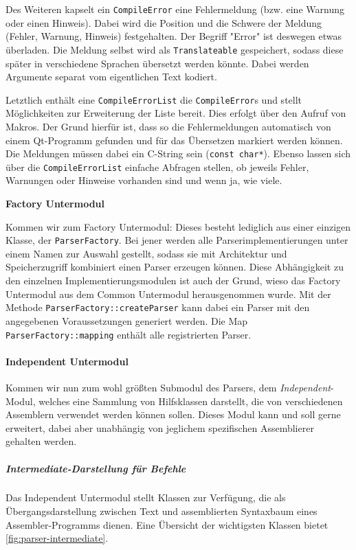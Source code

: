 Des Weiteren kapselt ein \texttt{CompileError} eine Fehlermeldung (bzw. eine
Warnung oder einen Hinweis). Dabei wird die Position und die Schwere der Meldung
(Fehler, Warnung, Hinweis) festgehalten. Der Begriff "Error" ist deswegen etwas
überladen. Die Meldung selbst wird als \texttt{Translateable} gespeichert,
sodass diese später in verschiedene Sprachen übersetzt werden könnte. Dabei
werden Argumente separat vom eigentlichen Text kodiert.

Letztlich enthält eine \texttt{CompileErrorList} die \texttt{CompileError}s und
stellt Möglichkeiten zur Erweiterung der Liste bereit. Dies erfolgt über den
Aufruf von Makros. Der Grund hierfür ist, dass so die Fehlermeldungen
automatisch von einem Qt-Programm gefunden und für das Übersetzen markiert
werden können. Die Meldungen müssen dabei ein C-String sein (\texttt{const
char*}). Ebenso lassen sich über die \texttt{CompileErrorList} einfache Abfragen
stellen, ob jeweils Fehler, Warnungen oder Hinweise vorhanden sind und wenn ja,
wie viele.

\textbf{Factory Untermodul}
\vspace{-0.2cm}

Kommen wir zum Factory Untermodul: Dieses besteht lediglich aus einer einzigen
Klasse, der \texttt{ParserFactory}. Bei jener werden alle
Parserimplementierungen unter einem Namen zur Auswahl gestellt, sodass sie mit
Architektur und Speicherzugriff kombiniert einen Parser erzeugen können. Diese
Abhängigkeit zu den einzelnen Implementierungsmodulen ist auch der Grund, wieso
das Factory Untermodul aus dem Common Untermodul herausgenommen wurde. Mit der
Methode \texttt{ParserFactory::createParser} kann dabei ein Parser mit den
angegebenen Voraussetzungen generiert werden. Die Map
\texttt{ParserFactory::mapping} enthält alle registrierten Parser.

\paragraph{Independent Untermodul}

Kommen wir nun zum wohl größten Submodul des Parsers, dem
\emph{Independent}-Modul, welches eine Sammlung von Hilfsklassen darstellt,
die von verschiedenen Assemblern verwendet werden können sollen. Dieses Modul
kann und soll gerne erweitert, dabei aber unabhängig von jeglichem spezifischen
Assemblierer gehalten werden.

\subparagraph{Intermediate-Darstellung für Befehle}

Das Independent Untermodul stellt Klassen zur Verfügung, die als
Übergangsdarstellung zwischen Text und assemblierten Syntaxbaum eines
Assembler-Programms dienen. Eine Übersicht der wichtigsten Klassen bietet
\autoref{fig:parser-intermediate}.

